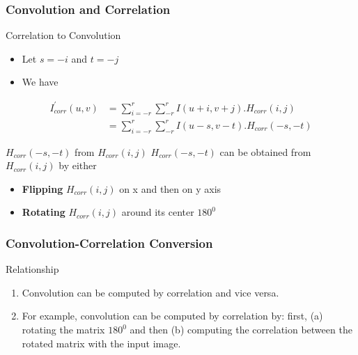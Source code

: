 \documentclass[english,11pt,table,handout]{beamer}
\begin{document}
\frame
{
	\frametitle{Convolution and Correlation}
	
	\begin{block}{Correlation to Convolution}
	\begin{itemize}
	\item Let $s=-i$ and $t=-j$ 
	\item We have
	\end{itemize}
	\begin{equation*} 
	\begin{split}
	I_{corr}^{'}{(u,v)} &= \sum_{i=-r}^{r}{\sum_{-r}^{r}{I(u+i, v+j).H_{corr}{(i,j)}}} \\
	&= \sum_{i=-r}^{r}{\sum_{-r}^{r}{I(u-s, v-t).H_{corr}{(-s,-t)}}} 
	\end{split}
	\end{equation*}
	\end{block}
	\begin{alertblock}{$H_{corr}{(-s,-t)}$ from $H_{corr}{(i,j)}$}
	$H_{corr}{(-s,-t)}$ can be obtained from $H_{corr}{(i,j)}$ by either
	\begin{itemize}
	\item \textbf{Flipping} $H_{corr}{(i,j)}$ on x and then on y axis
	\item \textbf{Rotating} $H_{corr}{(i,j)}$ around its center $180^0$
	\end{itemize}
	\end{alertblock}
	
}
\frame
{
	\frametitle{Convolution-Correlation Conversion}
	\begin{alertblock}{Relationship}
	\begin{enumerate}
		
		\item Convolution can be computed by correlation and vice versa.
		
		\item For example, convolution can be computed by correlation by: first, \alert{(a)} rotating the matrix $180^0$ and then \alert{(b)} computing the correlation between the rotated matrix with the input image.
		
	\end{enumerate}
	
	\end{alertblock}
}
\end{document}
